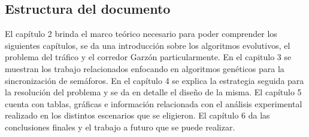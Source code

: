 \subsection{Estructura del documento}
El capítulo 2 brinda el marco teórico necesario para poder comprender los siguientes capítulos, se da una introducción sobre los algoritmos evolutivos, el problema del tráfico y el corredor Garzón particularmente.
En el capitulo 3 se muestran los trabajo relacionados enfocando en algoritmos genéticos para la sincronización de semáforos.
En el capítulo 4 se explica la estrategia seguida para la resolución del problema y se da en detalle el diseño de la misma.
El capítulo 5 cuenta con tablas, gráficas e información relacionada con el análisis experimental realizado en los distintos escenarios que se eligieron.
El capítulo 6 da las conclusiones finales y el trabajo a futuro que se puede realizar.






